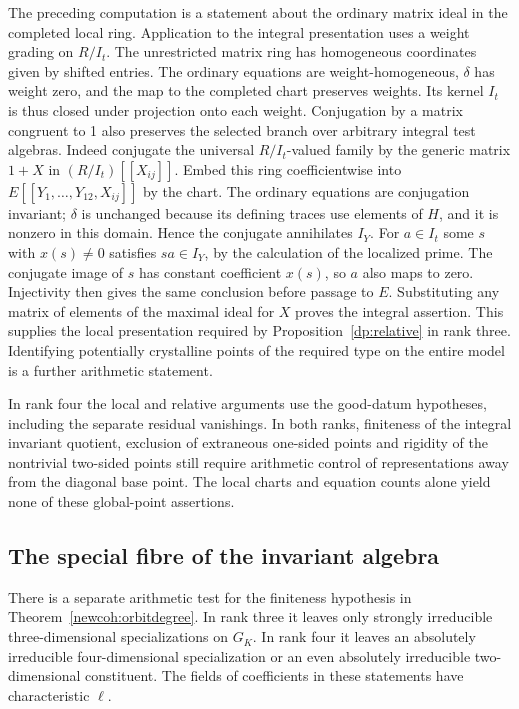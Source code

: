 The preceding computation is a statement about the ordinary matrix
ideal in the completed local ring. Application to the integral
presentation uses a weight grading on \(R/I_t\). The unrestricted
matrix ring has homogeneous coordinates given by shifted entries.
The ordinary equations are weight-homogeneous, \(\delta\) has
weight zero, and the map to the completed chart preserves weights.
Its kernel \(I_t\) is thus closed under projection onto each weight.
Conjugation by a matrix congruent to 1 also preserves the selected
branch over arbitrary integral test algebras. Indeed conjugate the
universal \(R/I_t\)-valued family by the generic matrix \(1+X\)
in \((R/I_t)[[X_{ij}]]\). Embed this ring coefficientwise into
\(E[[Y_1,\ldots,Y_{12},X_{ij}]]\) by the chart. The ordinary
equations are conjugation invariant; \(\delta\) is unchanged because
its defining traces use elements of \(H\), and it is nonzero in this
domain. Hence the conjugate annihilates \(I_Y\). For \(a\in I_t\)
some \(s\) with \(x(s)\ne0\) satisfies \(sa\in I_Y\), by the
calculation of the localized prime. The conjugate image of \(s\) has
constant coefficient \(x(s)\), so \(a\) also maps to zero.
Injectivity then gives the same conclusion before passage to \(E\).
Substituting any matrix of elements of the maximal ideal for \(X\)
proves the integral assertion. This supplies the local presentation required by
Proposition~\ref{dp:relative} in rank three. Identifying potentially
crystalline points of the required type on the entire model is
a further arithmetic statement.

In rank four the local and relative arguments use the good-datum
hypotheses, including the separate residual vanishings.
In both ranks, finiteness of the integral invariant quotient,
exclusion of extraneous one-sided points and rigidity of the
nontrivial two-sided points still require arithmetic control of
representations away from the diagonal base point. The local charts
and equation counts alone yield none of these global-point assertions.

\subsection{The special fibre of the invariant algebra}\label{dp:finitecurves}

There is a separate arithmetic test for the finiteness hypothesis in
Theorem~\ref{newcoh:orbitdegree}. In rank three it leaves only
strongly irreducible three-dimensional specializations on \(G_K\).
In rank four it leaves an absolutely irreducible four-dimensional
specialization or an even absolutely irreducible two-dimensional
constituent. The fields of coefficients in these statements have
characteristic \(\ell\).

